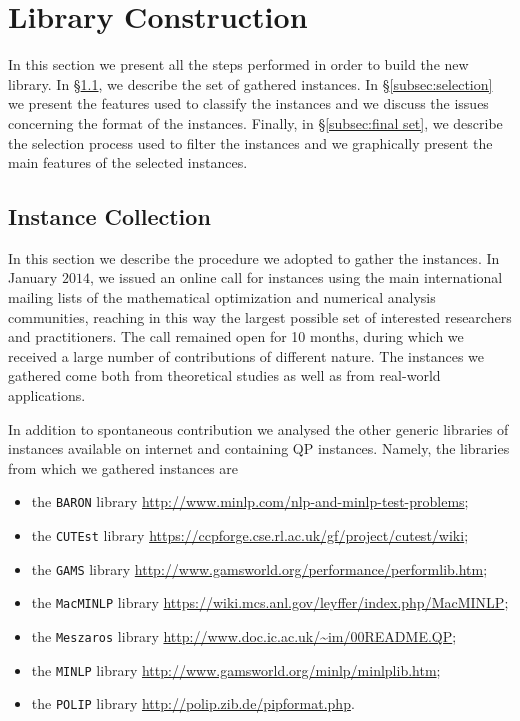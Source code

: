 \section{Library Construction}\label{sec:lib}

In this section we present all the steps performed in order to build the
new library. In \S \ref{subsec:instColl}, we describe the set of gathered
instances. In \S \ref{subsec:selection} we present the features used to
classify the instances and we discuss the issues concerning the format of
the instances. Finally, in \S \ref{subsec:final set}, we describe the
selection process used to filter the instances and we graphically present
the main features of the selected instances.

\subsection{Instance Collection}\label{subsec:instColl}

In this section we describe the procedure we adopted to gather the
instances. In January $2014$, we issued an online call for instances
using the main international mailing lists of the mathematical
optimization and numerical analysis communities, reaching in this way
the largest possible set of interested researchers and practitioners.
The call remained open for 10 months, during which we received a large
number of contributions of different nature. The instances we gathered
come both from theoretical studies as well as from real-world
applications.

In addition to spontaneous contribution we analysed the other generic
libraries of instances available  on internet and containing QP
instances. Namely, the libraries from which we gathered instances are
%
\begin{itemize}
 \item the {\tt BARON} library
 \url{http://www.minlp.com/nlp-and-minlp-test-problems};
%
\item the {\tt CUTEst} library
 \url{https://ccpforge.cse.rl.ac.uk/gf/project/cutest/wiki};
%
\item the {\tt GAMS} library
 \url{http://www.gamsworld.org/performance/performlib.htm};
%
\item the {\tt MacMINLP} library
 \url{https://wiki.mcs.anl.gov/leyffer/index.php/MacMINLP};
%
\item the {\tt Meszaros} library
 \url{http://www.doc.ic.ac.uk/~im/00README.QP};
%
\item the {\tt MINLP} library
 \url{http://www.gamsworld.org/minlp/minlplib.htm};
%
\item the {\tt POLIP} library
 \url{http://polip.zib.de/pipformat.php}.
\end{itemize}

